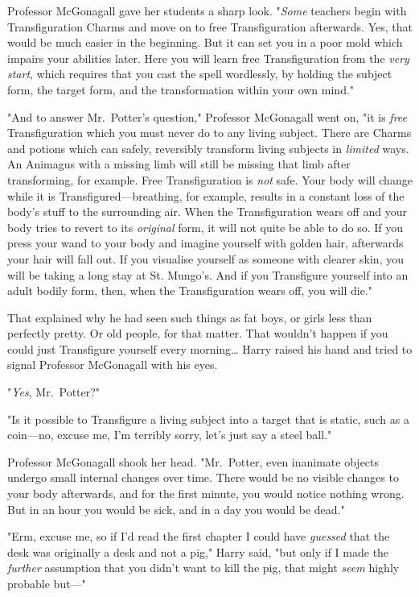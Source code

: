 Professor McGonagall gave her students a sharp look. "\emph{Some} teachers 
begin with Transfiguration Charms and move on to free Transfiguration 
afterwards. Yes, that would be much easier in the beginning. But it can set you 
in a poor mold which impairs your abilities later. Here you will learn free 
Transfiguration from the \emph{very start}, which requires that you cast the 
spell wordlessly, by holding the subject form, the target form, and the 
transformation within your own mind."

"And to answer Mr.~Potter's question," Professor McGonagall went on, "it is 
\emph{free} Transfiguration which you must never do to any living subject. 
There are Charms and potions which can safely, reversibly transform living 
subjects in \emph{limited} ways. An Animagus with a missing limb will still be 
missing that limb after transforming, for example. Free Transfiguration is 
\emph{not} safe. Your body will change while it is Transfigured---breathing, 
for example, results in a constant loss of the body's stuff to the surrounding 
air. When the Transfiguration wears off and your body tries to revert to its 
\emph{original} form, it will not quite be able to do so. If you press your 
wand to your body and imagine yourself with golden hair, afterwards your hair 
will fall out. If you visualise yourself as someone with clearer skin, you will 
be taking a long stay at St. Mungo's. And if you Transfigure yourself into an 
adult bodily form, then, when the Transfiguration wears off, you will die."

That explained why he had seen such things as fat boys, or girls less than 
perfectly pretty. Or old people, for that matter. That wouldn't happen if you 
could just Transfigure yourself every morning{\ldots} Harry raised his hand and 
tried to signal Professor McGonagall with his eyes.

"\emph{Yes}, Mr.~Potter?"

"Is it possible to Transfigure a living subject into a target that is static, 
such as a coin---no, excuse me, I'm terribly sorry, let's just say a steel 
ball."

Professor McGonagall shook her head. "Mr.~Potter, even inanimate objects 
undergo small internal changes over time. There would be no visible changes to 
your body afterwards, and for the first minute, you would notice nothing wrong. 
But in an hour you would be sick, and in a day you would be dead."

"Erm, excuse me, so if I'd read the first chapter I could have \emph{guessed} 
that the desk was originally a desk and not a pig," Harry said, "but only if I 
made the \emph{further} assumption that you didn't want to kill the pig, that 
might \emph{seem} highly probable but---"

